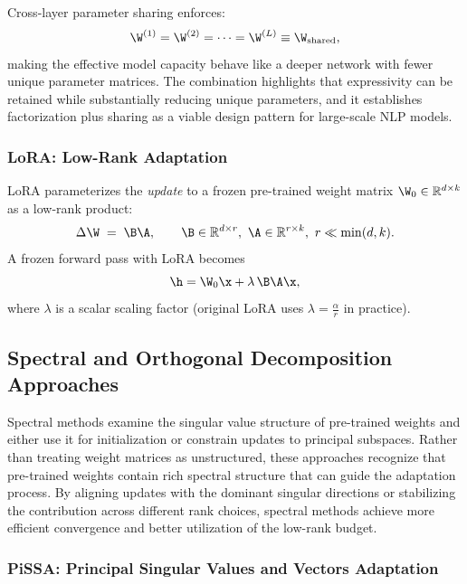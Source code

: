 Cross-layer parameter sharing enforces:
\begin{equation}
  \W^{(1)}=\W^{(2)}=\dots=\W^{(L)} \equiv \W_{\text{shared}},
\end{equation}
making the effective model capacity behave like a deeper network with fewer unique parameter matrices. The combination highlights that expressivity can be retained while substantially reducing unique parameters, and it establishes factorization plus sharing as a viable design pattern for large-scale NLP models.

\subsubsection{LoRA: Low-Rank Adaptation}
\label{subsubsec:lora}

LoRA parameterizes the \emph{update} to a frozen pre-trained weight matrix $\W_0\in\mathbb{R}^{d\times k}$ as a low-rank product:
\begin{equation}
  \Delta\W \;=\; \B\A, \qquad \B\in\mathbb{R}^{d\times r},\ \A\in\mathbb{R}^{r\times k},\ r\ll\min(d,k).
\end{equation}
A frozen forward pass with LoRA becomes
\begin{equation}
  \h = \W_0\x + \lambda\,\B\A\x,
\end{equation}
where $\lambda$ is a scalar scaling factor (original LoRA uses $\lambda=\frac{\alpha}{r}$ in practice).

\subsection{Spectral and Orthogonal Decomposition Approaches}
\label{subsec:spectral}

Spectral methods examine the singular value structure of pre-trained weights and either use it for initialization or constrain updates to principal subspaces. Rather than treating weight matrices as unstructured, these approaches recognize that pre-trained weights contain rich spectral structure that can guide the adaptation process. By aligning updates with the dominant singular directions or stabilizing the contribution across different rank choices, spectral methods achieve more efficient convergence and better utilization of the low-rank budget.

\subsubsection{PiSSA: Principal Singular Values and Vectors Adaptation}
\label{subsubsec:pissa}

